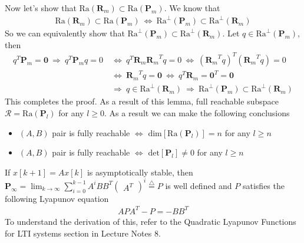 \documentclass[twoside]{article}
\begin{document}
Now let's show that $\mathrm{Ra}( \mathbf{R}_m ) \subset \mathrm{Ra}( \mathbf{P}_m )$. We know that
%
\begin{align*}
    \mathrm{Ra}( \mathbf{R}_m ) \subset \mathrm{Ra}( \mathbf{P}_m ) 
    \ \iff \ \mathrm{Ra}^\perp( \mathbf{P}_m ) \subset \mathrm{Ra}^\perp( \mathbf{R}_m )
\end{align*}
%
So we can equivalently show that $\mathrm{Ra}^\perp( \mathbf{P}_m ) \subset \mathrm{Ra}^\perp( \mathbf{R}_m )$.
Let $q \in \mathrm{Ra}^\perp( \mathbf{P}_m )$, then
%
%
\begin{align*}
    q^T \mathbf{P}_m = \mathbf{0} \ \Rightarrow \ q^T \mathbf{P}_m q = 0 \ &\iff \ q^T \mathbf{R}_m {\mathbf{R}_m}^T q = 0
    \ \iff \ ( {\mathbf{R}_m}^T q )^T ( {\mathbf{R}_m}^T q ) = 0
    \\ \ &\iff \ {\mathbf{R}_m}^T q = \mathbf{0} \ \iff \ q^T {\mathbf{R}_m} = \mathbf{0}^T = \mathbf{0}  
    \\ \ &\Rightarrow \ q \in \mathrm{Ra}^\perp( \mathbf{R}_m ) \ \Rightarrow \ \mathrm{Ra}^\perp( \mathbf{P}_m ) \subset \mathrm{Ra}^\perp( \mathbf{R}_m )
\end{align*}
%
This completes the proof. As a result of this lemma, full reachable subspace $\mathcal{R} = \mathrm{Ra}( \mathbf{P}_l )$ for any $l \geq 0$.
As a result we can make the following conclusions 
\begin{itemize}
\item $(A,B)$ pair is fully reachable $\iff$ $\mathrm{dim} \left [\mathrm{Ra}( \mathbf{P}_l ) \right] = n$ for any $l \geq n$
\item $(A,B)$ pair is fully reachable $\iff$ $\mathrm{det} \left [\mathbf{P}_l\right] \neq 0$ for any $l \geq n$
\end{itemize}
% 
If $x[k+1] = A x[k]$ is asymptotically stable, then $\textbf{P}_{\infty} = \lim_{k \to \infty} \sum\limits_{i=0}^{k-1} A^i B B^T \begin{pmatrix} A^T \end{pmatrix}^i \stackrel{\triangle}{=} P$ is well defined and $P$ satisfies the following Lyapunov equation
%
\begin{align*}
 A P A^T - P = -B B^T
\end{align*}
%
To understand the derivation of this, refer to the Quadratic Lyapunov Functions for LTI systems section in Lecture Notes 8. 

\end{document}
